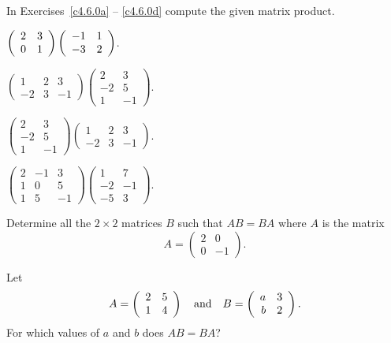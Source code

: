 \documentclass{ximera}
\begin{document}
\noindent In Exercises~\ref{c4.6.0a} -- \ref{c4.6.0d} compute
the given matrix product.
\begin{exercise}  \label{c4.6.0a}
$\left(\begin{array}{rr} 2 & 3\\ 0 &1\end{array}\right)\left(\begin{array}{rr} -1 & 1\\ -3 &2\end{array}\right)$.
\end{exercise}
\begin{exercise}  \label{c4.6.0b}
$\left(\begin{array}{rrr} 1 & 2 & 3\\ -2 & 3 & -1 \end{array}\right)
\left(\begin{array}{rr} 2 & 3\\ -2 & 5 \\1 & -1 \end{array}\right)$.
\end{exercise}
\begin{exercise}  \label{c4.6.0c}
$\left(\begin{array}{rr} 2 & 3\\ -2 & 5 \\1 & -1 \end{array}\right)
\left(\begin{array}{rrr} 1 & 2 & 3\\ -2 & 3 & -1 \end{array}\right)$.
\end{exercise}
\begin{exercise}  \label{c4.6.0d}
$\left(\begin{array}{rrr} 2 & -1 &3\\ 1 & 0 & 5\\1 & 5 & -1\end{array}\right)
\left(\begin{array}{rrr} 1 & 7 \\ -2 & -1 \\ -5 & 3\end{array}\right)$.
\end{exercise}


\begin{exercise} \label{c4.6.1}
Determine all the $2\times 2$ matrices $B$ such that $AB=BA$
where $A$ is the matrix
\[
A=\left(\begin{array}{rr} 2 & 0 \\ 0 & -1 \end{array}\right).
\]
\end{exercise}

\begin{exercise} \label{c4.6.2}
Let
\[
A=\left(\begin{array}{rr} 2 & 5\\ 1 &4\end{array}\right) \quad\mbox{and}\quad B=\left(\begin{array}{rr} a & 3\\ b &2\end{array}\right).
\]
For which values of $a$ and $b$ does $AB=BA$?
\end{exercise}
\end{document}
